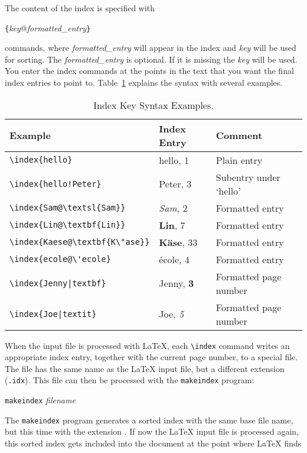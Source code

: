 The content of the index is specified with
\begin{lscommand}
  \verb|{|\emph{key}@\emph{formatted\_entry}\verb|}|
\end{lscommand}
\noindent commands, where \emph{formatted\_entry} will appear in the index
and \emph{key} will be used for sorting.  The \emph{formatted\_entry} is
optional. If it is missing the \emph{key} will be used. You enter the index
commands at the points in the text that you want the final index entries to
point to.  Table~\ref{index} explains the syntax with several examples.

\begin{table}[!tp]
  \centering
\caption{Index Key Syntax Examples.}
\label{index}
\begin{tabular}{@{}lll@{}}
  \toprule
  Example &Index Entry &Comment\\\midrule
  \rule{0pt}{1.05em}\verb|\index{hello}| &hello, 1 &Plain entry\\
\verb|\index{hello!Peter}|   &\hspace*{2ex}Peter, 3 &Subentry under `hello'\\
\verb|\index{Sam@\textsl{Sam}}|     &\textsl{Sam}, 2& Formatted entry\\
\verb|\index{Lin@\textbf{Lin}}|     &\textbf{Lin}, 7& Formatted entry\\
\verb|\index{Kaese@\textbf{K\"ase}}|     &\textbf{K\"ase}, 33& Formatted entry\\
\verb.\index{ecole@\'ecole}.     &\'ecole, 4& Formatted entry\\
\verb.\index{Jenny|textbf}.     &Jenny, \textbf{3}& Formatted page number\\
\verb.\index{Joe|textit}.     &Joe, \textit{5}& Formatted page number\\
\bottomrule
\end{tabular}
\end{table}

When the input file is processed with \LaTeX{}, each \verb|\index|
command writes an appropriate index entry, together with the current
page number, to a special file. The file has the same name as the
\LaTeX{} input file, but a different extension (\verb|.idx|). This
 file can then be processed with the \texttt{makeindex}
program:

\begin{lscommand}
  \texttt{makeindex} \emph{filename}
\end{lscommand}
The \texttt{makeindex} program generates a sorted index with the same base
file name, but this time with the extension . If now the
\LaTeX{} input file is processed again, this sorted index gets
included into the document at the point where \LaTeX{} finds
\begin{lscommand}
\end{lscommand}

